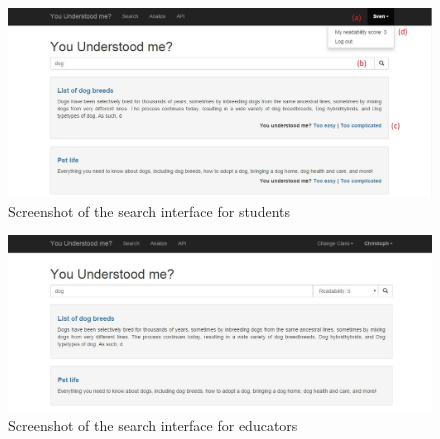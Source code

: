 \documentclass{sig-alternate-05-2015}
\begin{document}





%
%

%
%
\printccsdesc




\begin{figure}[ht]
 \centering
  \includegraphics[width=1\textwidth]{creatingFigures/Capture20}
 \caption{Screenshot of the search interface for students}
 \label{fig:studentSearch}
 \end{figure}



\begin{figure}[ht]
 \centering
  \includegraphics[width=1\textwidth]{creatingFigures/Capture18}
 \caption{Screenshot of the search interface for educators}
  \label{fig:educatorSearch}
 \end{figure}
 
\end{document}

